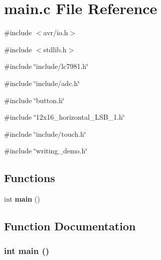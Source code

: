 \section{main.c File Reference}
\label{main_8c}
{\ttfamily \#include $<$avr/io.h$>$}\par
{\ttfamily \#include $<$stdlib.h$>$}\par
{\ttfamily \#include \char`\"{}include/lc7981.h\char`\"{}}\par
{\ttfamily \#include \char`\"{}include/adc.h\char`\"{}}\par
{\ttfamily \#include \char`\"{}button.h\char`\"{}}\par
{\ttfamily \#include \char`\"{}12x16\_\-horizontal\_\-LSB\_\-1.h\char`\"{}}\par
{\ttfamily \#include \char`\"{}include/touch.h\char`\"{}}\par
{\ttfamily \#include \char`\"{}writing\_\-demo.h\char`\"{}}\par
\subsection*{Functions}
\begin{DoxyCompactItemize}
\item 
int {\bf main} ()
\end{DoxyCompactItemize}


\subsection{Function Documentation}
\subsubsection[{main}]{\setlength{\rightskip}{0pt plus 5cm}int main ()}\label{main_8c_ae66f6b31b5ad750f1fe042a706a4e3d4}
